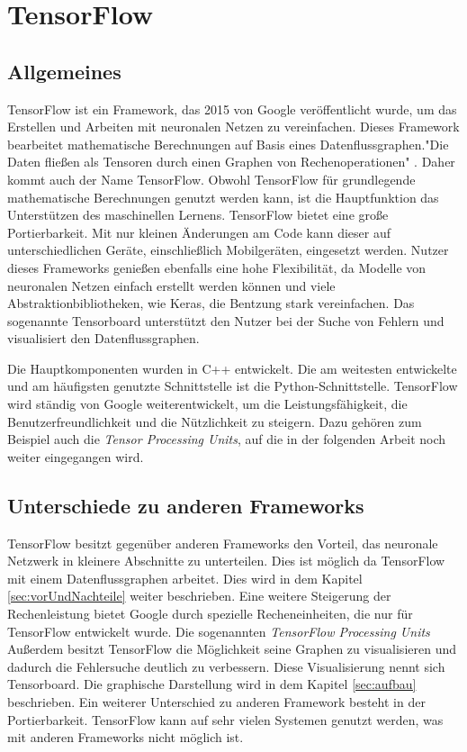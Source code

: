 \chapter{TensorFlow}
\label{chap:tensorflow}
\section{Allgemeines}
\label{sec:allgemeines}
\printsubchapterauthor{\authorNiklas}
TensorFlow ist ein Framework, das 2015 von Google veröffentlicht wurde, um das Erstellen und Arbeiten mit neuronalen Netzen zu vereinfachen. Dieses Framework bearbeitet mathematische Berechnungen auf Basis eines Datenflussgraphen."Die Daten fließen als Tensoren durch einen Graphen von Rechenoperationen" \citep{Einfuehrung}. Daher kommt auch der Name TensorFlow. Obwohl TensorFlow für grundlegende mathematische Berechnungen genutzt werden kann, ist die Hauptfunktion das Unterstützen des maschinellen Lernens. TensorFlow bietet eine große Portierbarkeit. Mit nur kleinen Änderungen am Code kann dieser auf unterschiedlichen Geräte, einschließlich Mobilgeräten, eingesetzt werden. Nutzer dieses Frameworks genießen ebenfalls eine hohe Flexibilität, da Modelle von neuronalen Netzen einfach erstellt werden können und viele Abstraktionbibliotheken, wie Keras, die Bentzung stark vereinfachen. Das sogenannte Tensorboard unterstützt den Nutzer bei der Suche von Fehlern und visualisiert den Datenflussgraphen. \cite{Einfuehrung} 

Die Hauptkomponenten wurden in C++ entwickelt. Die am weitesten entwickelte und am häufigsten genutzte Schnittstelle ist die Python-Schnittstelle. TensorFlow wird ständig von Google weiterentwickelt, um die Leistungsfähigkeit, die Benutzerfreundlichkeit und die Nützlichkeit zu steigern. Dazu gehören zum Beispiel auch die \textit{Tensor Processing Units}, auf die in der folgenden Arbeit noch weiter eingegangen wird.

\section{Unterschiede zu anderen Frameworks}
\label{sec:unterschiede}
\printsubchapterauthor{\authorNiklas}
TensorFlow besitzt gegenüber anderen Frameworks den Vorteil, das neuronale Netzwerk in kleinere Abschnitte zu unterteilen. Dies ist möglich da TensorFlow mit einem Datenflussgraphen arbeitet. Dies wird in dem Kapitel \ref{sec:vorUndNachteile} weiter beschrieben. Eine weitere Steigerung der Rechenleistung bietet Google durch spezielle Recheneinheiten, die nur für TensorFlow entwickelt wurde. Die sogenannten \textit{TensorFlow Processing Units} Außerdem besitzt TensorFlow die Möglichkeit seine Graphen zu visualisieren und dadurch die Fehlersuche deutlich zu verbessern. Diese Visualisierung nennt sich Tensorboard. Die graphische Darstellung wird in dem Kapitel \ref{sec:aufbau} beschrieben. Ein weiterer Unterschied zu anderen Framework besteht in der Portierbarkeit. TensorFlow kann auf sehr vielen Systemen genutzt werden, was mit anderen Frameworks nicht möglich ist.
